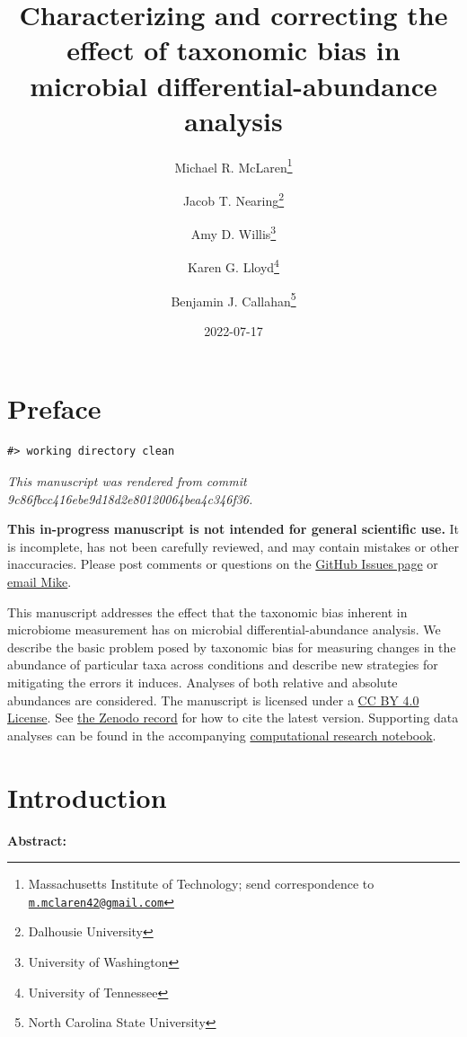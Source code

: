 \documentclass[
]{article}
\title{Characterizing and correcting the effect of taxonomic bias in microbial differential-abundance analysis}
\author{Michael R. McLaren\footnote{Massachusetts Institute of Technology; send correspondence to \href{mailto:m.mclaren42@gmail.com}{\nolinkurl{m.mclaren42@gmail.com}}} \and Jacob T. Nearing\footnote{Dalhousie University} \and Amy D. Willis\footnote{University of Washington} \and Karen G. Lloyd\footnote{University of Tennessee} \and Benjamin J. Callahan\footnote{North Carolina State University}}
\date{2022-07-17}
\begin{document}
\maketitle

{
\setcounter{tocdepth}{2}
\tableofcontents
}
\hypertarget{preface}{%
\section*{Preface}\label{preface}}

\begin{verbatim}
#> working directory clean
\end{verbatim}

\emph{This manuscript was rendered from commit 9c86fbcc416ebe9d18d2e80120064bea4c346f36.}

\leavevmode{}%
\textbf{This in-progress manuscript is not intended for general scientific use.}
It is incomplete, has not been carefully reviewed, and may contain mistakes or other inaccuracies.
Please post comments or questions on the \href{https://github.com/mikemc/differential-abundance-theory/issues}{GitHub Issues page} or \href{m.mclaren42@gmail.com}{email Mike}.

This manuscript addresses the effect that the taxonomic bias inherent in microbiome measurement has on microbial differential-abundance analysis.
We describe the basic problem posed by taxonomic bias for measuring changes in the abundance of particular taxa across conditions and describe new strategies for mitigating the errors it induces.
Analyses of both relative and absolute abundances are considered.
The manuscript is licensed under a \href{https://creativecommons.org/licenses/by/4.0/}{CC BY 4.0 License}.
See \href{https://doi.org/10.5281/zenodo.4552717}{the Zenodo record} for how to cite the latest version.
Supporting data analyses can be found in the accompanying \href{https://mikemc.github.io/differential-abundance-theory/notebook/}{computational research notebook}.

\hypertarget{introduction}{%
\section{Introduction}\label{introduction}}

\leavevmode{}%
\textbf{Abstract:}
\end{document}
